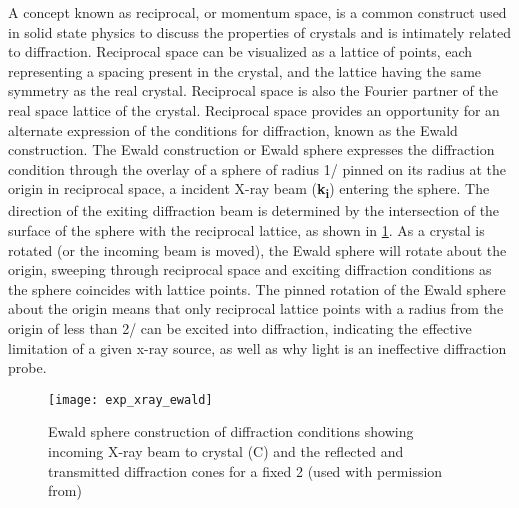 A concept known as reciprocal, or momentum space, is a common construct used in solid state physics to discuss the properties of crystals and is intimately related to diffraction. Reciprocal space can be visualized as a lattice of points, each representing a spacing present in the crystal, and the lattice having the same symmetry as the real crystal. Reciprocal space is also the Fourier partner of the real space lattice of the crystal. Reciprocal space provides an opportunity for an alternate expression of the conditions for diffraction, known as the Ewald construction. The Ewald construction or Ewald sphere expresses the diffraction condition through the overlay of a sphere of radius 1/\textlambda{} pinned on its radius at the origin in reciprocal space, a incident X-ray beam (\textbf{k\textsubscript{i}}) entering the sphere. The direction of the exiting diffraction beam is determined by the intersection of the surface of the sphere with the reciprocal lattice, as shown in \cref{fig:exp_xray_ewald}. As a crystal is rotated (or the incoming beam is moved), the Ewald sphere will rotate about the origin, sweeping through reciprocal space and exciting diffraction conditions as the sphere coincides with lattice points. The pinned rotation of the Ewald sphere about the origin means that only reciprocal lattice points with a radius from the origin of less than 2/\textlambda{} can be excited into diffraction, indicating the effective limitation of a given x-ray source, as well as why light is an ineffective diffraction probe.
\begin{figure}
\centering
\texttt{[image: exp\_xray\_ewald]}
\caption[Ewald sphere]{\label{fig:exp_xray_ewald}Ewald sphere construction of diffraction conditions showing incoming X-ray beam to crystal (C) and the reflected and transmitted diffraction cones for a fixed 2\straighttheta{} (used with permission from\cite{He2009})}
\end{figure}

